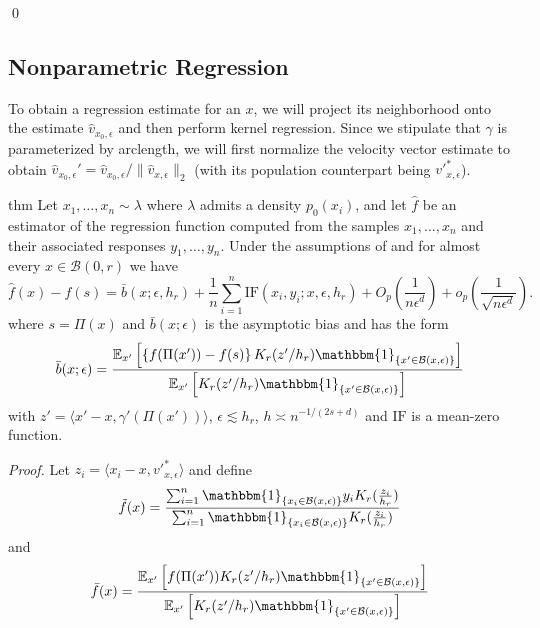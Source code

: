 \documentclass[11pt]{article}
\begin{document}
\qed{}

\subsection{Nonparametric Regression}

To obtain a regression estimate for an $x$, we will project its neighborhood onto the estimate $\hat{v}_{x_0, \epsilon}$ and then perform kernel regression. Since we stipulate that $\gamma$ is parameterized by arclength, we will first normalize the velocity vector estimate to obtain $\hat{v}_{x_0, \epsilon}' = \hat{v}_{x_0, \epsilon}/\|\hat{v}_{x, \epsilon}\|_2$ (with its population counterpart being $v'^{*}_{x, \epsilon}$). 

\begin{restatable}{thm}{} \label{thm: regression ptwise decomp}
    Let $x_1, \dots, x_n \sim \lambda$ where $\lambda$ admits a density $p_0(x_i)$, and let $\hat{f}$ be an estimator of the regression function computed from the samples $x_1, \dots, x_n$ and their associated responses $y_1, \dots, y_n$. Under the assumptions of  and for almost every $x\in \mathcal{B}(0, r)$ we have
    \[\hat{f}(x) - f(s) = \bar{b}(x; \epsilon, h_r) + \frac{1}{n}\sum_{i = 1}^n\text{IF} (x_i, y_i; x, \epsilon, h_r) + O_p\left(\frac{1}{n\epsilon^{d}}\right) + o_p\left(\frac{1}{\sqrt{n\epsilon^d}}\right). \]
    where $s = \Pi(x)$ and $\bar{b}(x;\epsilon)$ is the asymptotic bias and has the form
    \begin{equation}
        \bar{b}(x; \epsilon) = \frac{\mathbb{E}_{x'}\left[\left\{f(\Pi(x')) - f(s)\right\}K_r(z'/h_r)\mathbbm{1}_{\{x'\in \mathcal{B}(x, \epsilon)\}}\right]}{\mathbb{E}_{x'}\left[K_r(z'/h_r)\mathbbm{1}_{\{x'\in \mathcal{B}(x, \epsilon)\}}\right]}
    \end{equation}
    with $z' = \langle x' - x, \gamma'(\Pi(x'))\rangle$, $\epsilon \lesssim h_r$, $h\asymp n^{-1/(2s+d)}$ and $\text{IF}$ is a mean-zero function.
\end{restatable}
\noindent \textit{Proof.} Let $z_i = \langle x_i - x, v'^*_{x, \epsilon}\rangle$ and define
\begin{equation}
\tilde{f}(x) = \frac{\sum_{i=1}^n \mathbbm{1}_{\{x_i\in \mathcal{B}(x, \epsilon)\}}y_iK_r(\frac{z_i}{h_r})}{\sum_{i=1}^n \mathbbm{1}_{\{x_i\in \mathcal{B}(x, \epsilon)\}}K_r(\frac{z_i}{h_r})} \label{eq: ftilde}
\end{equation}
and
\begin{equation}\bar{f}(x) = \frac{\mathbb{E}_{x'}\left[f(\Pi(x'))K_r(z'/h_r)\mathbbm{1}_{\{x'\in \mathcal{B}(x, \epsilon)\}}\right]}{\mathbb{E}_{x'}\left[K_r(z'/h_r)\mathbbm{1}_{\{x'\in \mathcal{B}(x, \epsilon)\}}\right]} \label{eq: fbar}
\end{equation}
\end{document}
